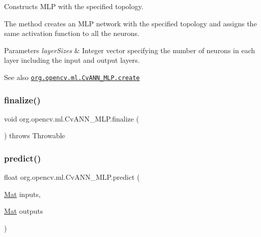 Constructs M\+LP with the specified topology.

The method creates an M\+LP network with the specified topology and assigns the same activation function to all the neurons.


\begin{DoxyParams}{Parameters}
{\em layer\+Sizes} & Integer vector specifying the number of neurons in each layer including the input and output layers.\\
\hline
\end{DoxyParams}
\begin{DoxySeeAlso}{See also}
\href{http://docs.opencv.org/modules/ml/doc/neural_networks.html#cvann-mlp-create}{\tt org.\+opencv.\+ml.\+Cv\+A\+N\+N\+\_\+\+M\+L\+P.\+create} 
\end{DoxySeeAlso}
\mbox{\label{classorg_1_1opencv_1_1ml_1_1_cv_a_n_n___m_l_p_a3f1c0f088a3b739fb6ddd63d7a9d5f9c}} 
\subsubsection{\texorpdfstring{finalize()}{finalize()}}
{\footnotesize\ttfamily void org.\+opencv.\+ml.\+Cv\+A\+N\+N\+\_\+\+M\+L\+P.\+finalize (\begin{DoxyParamCaption}{ }\end{DoxyParamCaption}) throws Throwable\hspace{0.3cm}{\ttfamily [protected]}}

\mbox{\label{classorg_1_1opencv_1_1ml_1_1_cv_a_n_n___m_l_p_ab694e4722b8f4f8af388a690be40e511}} 
\subsubsection{\texorpdfstring{predict()}{predict()}}
{\footnotesize\ttfamily float org.\+opencv.\+ml.\+Cv\+A\+N\+N\+\_\+\+M\+L\+P.\+predict (\begin{DoxyParamCaption}\item[{\mbox{\hyperlink{classorg_1_1opencv_1_1core_1_1_mat}{Mat}}}]{inputs,  }\item[{\mbox{\hyperlink{classorg_1_1opencv_1_1core_1_1_mat}{Mat}}}]{outputs }\end{DoxyParamCaption})}

